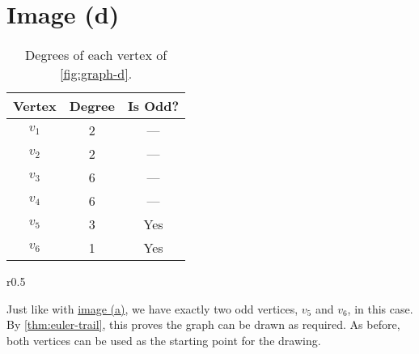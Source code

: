 \section{Image (d)}

\begin{table}[H]
    \caption{Degrees of each vertex of \cref{fig:graph-d}.}
    \label{tab:graph-d}

    \centering
    \begin{tabular}{ccc}
        \toprule
        \toprule
            Vertex & Degree & Is Odd? \\
        \midrule
            $v_1$ & 2 & --- \\
            $v_2$ & 2 & --- \\
            $v_3$ & 6 & --- \\
            $v_4$ & 6 & --- \\
            $v_5$ & 3 & Yes \\
            $v_6$ & 1 & Yes \\
        \bottomrule
        \bottomrule
    \end{tabular}
\end{table}

\begin{wrapfigure}{r}{0.5\textwidth}
    \centering
    

    \caption{Image \texttt{d.} with labelled nodes.}
    \label{fig:graph-d}
\end{wrapfigure}

Just like with \hyperref[sec:graph-a]{image (a)}, we have exactly two odd vertices, $v_5$ and $v_6$, in this case. By \cref{thm:euler-trail}, this proves the graph can be drawn as required. As before, both vertices can be used as the starting point for the drawing.
